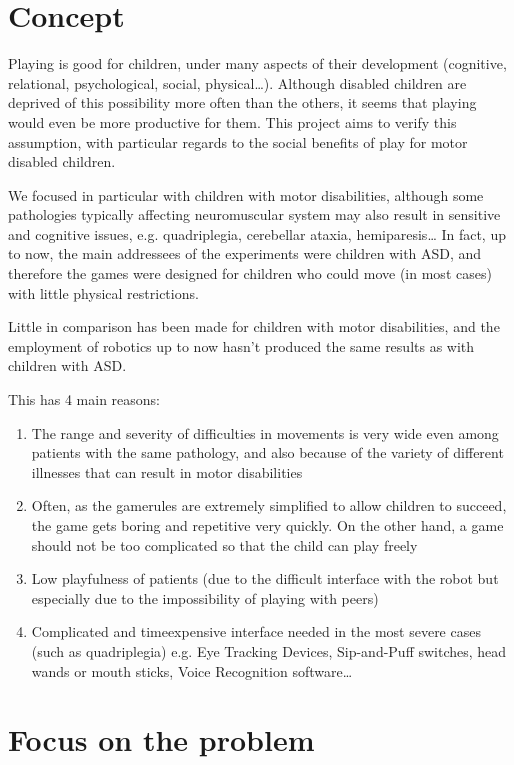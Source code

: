 \documentclass[a4paper,twoside]{book}
\begin{document}
\section{Concept}

Playing is good for children, under many aspects of their development (cognitive, relational, psychological, social, physical\ldots). Although disabled children are deprived of this possibility more often than the others, it seems that playing would even be more productive for them.
This project aims to verify this assumption, with particular regards to the social benefits of play for motor disabled children.

We focused in particular with children with motor disabilities, although some pathologies typically affecting neuromuscular system may also result in sensitive and cognitive issues, e.g. quadriplegia, cerebellar ataxia, hemiparesis\ldots
In fact, up to now, the main addressees of the experiments were children with ASD, and therefore the games were designed for children who could move (in most cases) with little physical restrictions.

Little in comparison has been made for children with motor disabilities, and the employment of robotics up to now hasn't produced the same results as with children with ASD.

\beforelist This has 4 main reasons:
\begin{enumerate}
\item The range and severity of difficulties in movements is very wide even among patients with the same pathology, and also because of the variety of different illnesses that can result in motor disabilities
\item Often, as the game\textendash rules are extremely simplified to allow children to succeed, the game gets boring and repetitive very quickly. On the other hand, a game should not be too complicated so that the child can play freely
\item Low playfulness of patients (due to the difficult interface with the robot but especially due to the impossibility of playing with peers)
\item Complicated and time\textendash expensive interface needed in the most severe cases (such as quadriplegia) e.g. Eye Tracking Devices, Sip-and-Puff switches, head wands or mouth sticks, Voice Recognition software\ldots
\end{enumerate}
\afterlist*

\section{Focus on the problem}
\end{document}
